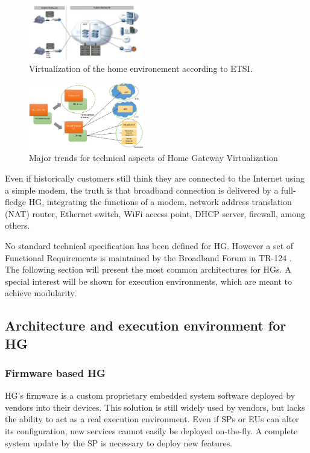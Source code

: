 \begin{figure}
  \begin{center}
    \includegraphics[width=0.45\textwidth,natwidth=769,natheight=369]{fig/vHGetsi.png}
  \end{center}
  \caption{ Virtualization of the home environement according to ETSI.
    \label{fig:etsi-vision}
  }
\end{figure}

\begin{figure}
  \begin{center}
    \includegraphics[width=0.45\textwidth,natwidth=7838,natheight=4517]{fig/vhgtrends.png}
  \end{center}
  \caption{ Major trends for technical aspects of Home Gateway Virtualization
    \label{fig:trends}
  }
\end{figure}


Even if historically customers still think they are connected to the Internet using a simple modem, the truth is that broadband connection is delivered by a full-fledge HG, integrating the functions of a modem, network address translation (NAT) router, Ethernet switch, WiFi access point, DHCP server, firewall, among others.
 
No standard technical specification has been defined for HG. However a set of Functional Requirements is maintained by the Broadband Forum in TR-124 \cite{broadband_forum_functional_2014}.
The following section will present the most common architectures for HGs.
A special interest will be shown for execution environments, which are meant to achieve modularity.

\subsection{Architecture and execution environment for HG}
  \subsubsection{Firmware based HG}
HG's firmware is a custom proprietary embedded system software deployed by vendors into their devices.
This solution is still widely used by vendors, but lacks the ability to act as a real execution environment.
Even if SPs or EUs can alter its configuration, new services cannot easily be deployed on-the-fly.
A complete system update by the SP is necessary to deploy new features.
   
